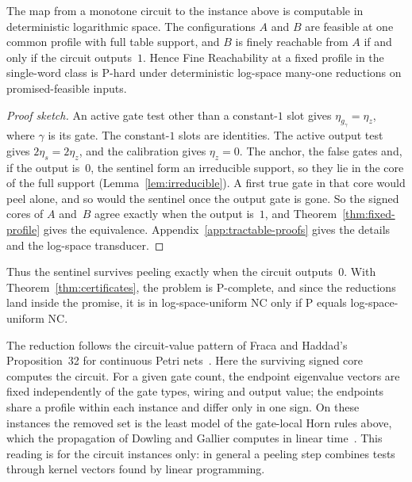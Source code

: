 \begin{theorem}[P-hardness]\label{thm:p-hard}
The map from a monotone circuit to the instance above is computable in
deterministic logarithmic space. The configurations $A$ and $B$ are
feasible at one common profile with full table support, and $B$ is finely
reachable from $A$ if and only if the circuit outputs~$1$. Hence Fine
Reachability at a fixed profile in the single-word class is P-hard under
deterministic log-space many-one reductions on promised-feasible inputs.
\end{theorem}

\begin{proof}[Proof sketch]
An active gate test other
than a constant-$1$ slot gives $\eta_{g_\gamma}=\eta_z$, where $\gamma$ is
its gate. The constant-$1$ slots are identities. The active output test
gives $2\eta_s=2\eta_z$, and the calibration gives $\eta_z=0$. The anchor,
the false gates and, if the output is~$0$, the sentinel form an irreducible
support, so they lie in the core of the full support
(Lemma~\ref{lem:irreducible}). A first true gate in that core would peel
alone, and so would the sentinel once the output gate is gone. So the
signed cores of $A$ and~$B$ agree exactly when the output is~$1$, and
Theorem~\ref{thm:fixed-profile} gives the equivalence.
Appendix~\ref{app:tractable-proofs} gives the details and the log-space
transducer.
\end{proof}

Thus the sentinel survives peeling exactly when the circuit outputs~$0$.
With
Theorem~\ref{thm:certificates}, the problem is P-complete, and since the
reductions land inside the promise, it is in log-space-uniform NC only if P
equals log-space-uniform NC.

The reduction follows the circuit-value pattern of Fraca and Haddad's
Proposition~32 for continuous Petri nets~\cite{fracahaddad}. Here the
surviving signed core computes the circuit. For a given gate count, the
endpoint eigenvalue vectors are fixed independently of the gate types,
wiring and output value; the endpoints share a profile within each
instance and differ only in one sign. On these instances the removed set
is the least model of the gate-local Horn rules above, which the
propagation of Dowling and Gallier computes in linear
time~\cite[Sections~4--5]{dowlinggallier}. This reading is for the circuit
instances only: in general a peeling step combines tests through kernel
vectors found by linear programming.


